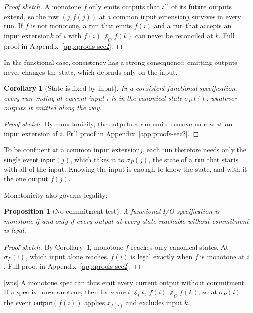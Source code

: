 \documentclass[sigconf]{cidr-2027}
\newtheorem{proposition}{Proposition}
\newtheorem{corollary}{Corollary}
\theoremstyle{remark}
\newcommand{\InputOrd}{\preceq_I}
\newcommand{\OutputOrd}{\preceq_O}
\newcommand{\commitment}{commitment\xspace}
\newcommand{\indesc}{input extension\xspace} %
\newcommand{\outrelbase}{extend\xspace}       %
\newcommand{\spectype}[1][]{I/O specification#1\xspace}
\begin{document}
\begin{proof}[Proof sketch]
A monotone $f$ only emits outputs that all of its future outputs \outrelbase,
so the row $(j,f(j))$ at a common \indesc $j$ survives in every run.
If $f$ is not monotone, a run that emits $f(i)$ and a run that accepts an
\indesc $k$ of $i$ with $f(i)\not\OutputOrd f(k)$ can never be reconciled at $k$.  Full proof in Appendix~\ref{app:proofs-sec2}.
\end{proof}

In the functional case, consistency has a strong consequence: emitting outputs
never changes the state, which depends only on the input.

\begin{corollary}[State is fixed by input]
\label{cor:state-by-input}
In a consistent functional specification, every run ending at current
input $i$ is in the canonical state $\sigma_P(i)$, whatever outputs it emitted
along the way.
\end{corollary}

\begin{proof}[Proof sketch]
By monotonicity, the outputs a run emits remove no row at an \indesc
of $i$.  Full proof in Appendix~\ref{app:proofs-sec2}.
\end{proof}

To be confluent at a common \indesc $j$, each run therefore needs only the
single event $\mathsf{input}(j)$, which takes it to $\sigma_P(j)$, the state of a
run that starts with all of the input.  Knowing the input is enough to know the state, and with it the one
output $f(j)$.

Monotonicity also governs legality:

\begin{proposition}[No-\commitment test]
\label{prop:functional-exposure-boundary}
A functional \spectype is monotone if and only if every output at
every state reachable without \commitment is legal.
\end{proposition}

\begin{proof}[Proof sketch]
By Corollary~\ref{cor:state-by-input}, monotone $f$ reaches only canonical
states. At $\sigma_P(i)$, which input alone reaches, $f(i)$ is legal exactly
when $f$ is monotone at $i$.  Full proof in Appendix~\ref{app:proofs-sec2}.
\end{proof}



{\footnotesize\color{black!50}\noindent\textsf{[was]} A monotone spec can thus emit every current output without \commitment. If a
spec is non-monotone, then for some $i\InputOrd k$,
$f(i)\not\OutputOrd f(k)$, so at $\sigma_P(i)$ the event
$\mathsf{output}(f(i))$ applies $x_{f(i)}$ and excludes input $k$.\par}
\end{document}
